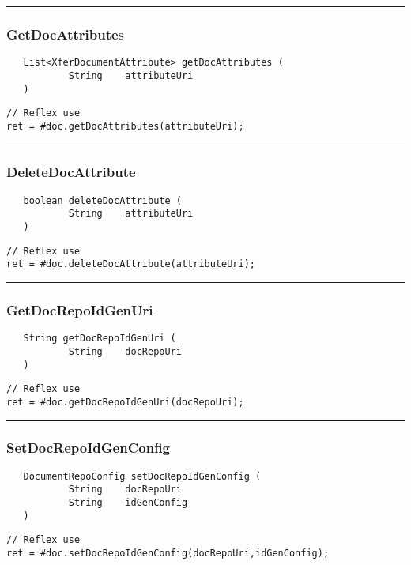\rule{15cm}{2pt}
\subsubsection{GetDocAttributes}
\label{Api:GetDocAttributes}
\begin{verbatim}
   List<XferDocumentAttribute> getDocAttributes (
           String    attributeUri
   )
\end{verbatim}
\begin{lstlisting}[language=reflex]
// Reflex use
ret = #doc.getDocAttributes(attributeUri);
\end{lstlisting}



\rule{15cm}{2pt}
\subsubsection{DeleteDocAttribute}
\label{Api:DeleteDocAttribute}
\begin{verbatim}
   boolean deleteDocAttribute (
           String    attributeUri
   )
\end{verbatim}
\begin{lstlisting}[language=reflex]
// Reflex use
ret = #doc.deleteDocAttribute(attributeUri);
\end{lstlisting}



\rule{15cm}{2pt}
\subsubsection{GetDocRepoIdGenUri}
\label{Api:GetDocRepoIdGenUri}
\begin{verbatim}
   String getDocRepoIdGenUri (
           String    docRepoUri
   )
\end{verbatim}
\begin{lstlisting}[language=reflex]
// Reflex use
ret = #doc.getDocRepoIdGenUri(docRepoUri);
\end{lstlisting}



\rule{15cm}{2pt}
\subsubsection{SetDocRepoIdGenConfig}
\label{Api:SetDocRepoIdGenConfig}
\begin{verbatim}
   DocumentRepoConfig setDocRepoIdGenConfig (
           String    docRepoUri
           String    idGenConfig
   )
\end{verbatim}
\begin{lstlisting}[language=reflex]
// Reflex use
ret = #doc.setDocRepoIdGenConfig(docRepoUri,idGenConfig);
\end{lstlisting}



